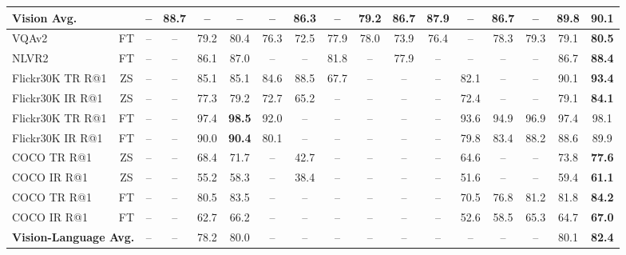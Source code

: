 \documentclass[11pt]{article}
\newcommand{\ModelName}{X-FM\xspace}
\begin{document}
\begin{table*}[t]
{\begin{tabular}{lc|ccccccccccccccc}
\midrule 
\textbf{Vision Avg.} & & -- & 88.7 & -- & -- & -- & 86.3 & -- & 79.2 & 86.7 & 87.9 & -- & 86.7 & -- & 89.8 & {\bf 90.1} \\
\midrule
VQAv2 & FT & -- & -- & 79.2 & 80.4 & 76.3 & 72.5 & 77.9 & 78.0 & 73.9 & 76.4 & -- & 78.3 & 79.3 & 79.1 & {\bf 80.5}  \\
NLVR2 & FT & -- & -- & 86.1 & 87.0 & -- & -- & 81.8 & -- & 77.9 & -- & -- & -- & -- & 86.7 & {\bf 88.4}  \\
Flickr30K TR R@1 & ZS & -- & -- & 85.1 & 85.1 & 84.6 & 88.5 & 67.7 &-- & -- & -- & 82.1 & -- & -- & 90.1 & {\bf 93.4}  \\
Flickr30K IR R@1 & ZS & -- & -- & 77.3 & 79.2 & 72.7 & 65.2 & -- & -- & -- & -- & 72.4 & -- & -- & 79.1 & {\bf 84.1} \\
Flickr30K TR R@1 & FT & -- & -- & 97.4 & {\bf 98.5} & 92.0 & -- & -- & -- & -- & -- & 93.6 & 94.9 & 96.9 & 97.4 & 98.1 \\
Flickr30K IR R@1 & FT & -- & -- & 90.0 & {\bf 90.4} & 80.1 & -- & -- & -- & -- & -- & 79.8 & 83.4 & 88.2 & 88.6 & 89.9 \\
COCO TR R@1 & ZS & -- & -- & 68.4 & 71.7 & -- & 42.7 & -- & -- & -- & -- & 64.6 & -- & -- & 73.8 & {\bf 77.6} \\
COCO IR R@1 & ZS & -- & -- & 55.2 & 58.3 & -- & 38.4 & -- & -- & -- &  -- & 51.6 & -- & -- & 59.4 & {\bf 61.1} \\
COCO TR R@1 & FT & -- & -- & 80.5 & 83.5 & -- & -- & -- & -- & -- & -- & 70.5 & 76.8  & 81.2 &  81.8 & {\bf 84.2} \\
COCO IR R@1 & FT & -- & -- & 62.7 & 66.2 & -- & -- & -- & -- & -- & -- & 52.6 & 58.5 & 65.3 & 64.7 & {\bf 67.0} \\
\midrule
\multicolumn{2}{l}{\textbf{Vision-Language Avg.}} & -- & -- & 78.2 & 80.0 & -- & -- & -- & -- & -- & -- & -- & -- & -- & 80.1 & {\bf 82.4} \\
\bottomrule
\end{tabular}}
\caption{
\textbf{Experimental results on vision, language and vision-language tasks.}
The multi-modal data size used for pre-training are reported under the model name.
MNLI results are average of MNLI-m and MNLI-mm. 
MRPC results are average accuracies and F1 scores.
Matthews correlation coefficient (MCC) is reported for CoLA, and Pearson correlation coefficient (PCC) is reported for STS-B.
We report accuracies for all the vision and multi-modal tasks. FT is short for fine-tuning, LE for linear evaluation, ZS for zero-shot, TR for text retrieval, and IR for image retrieval. Results for RoBERTa are from its corresponding paper~\citep{liu2019roberta}, and they use the mid-training~\citep{Phang2018SentenceEO} on MNLI for RTE, MRPC, and STS-B while other models (e.g., DaVinci, {\ModelName}) do not use this trick. Note that mPLUG-2 used more layers and parameters than RoBERTa and {\ModelName} for the language understanding tasks.  
}
\end{table*}
\end{document}

